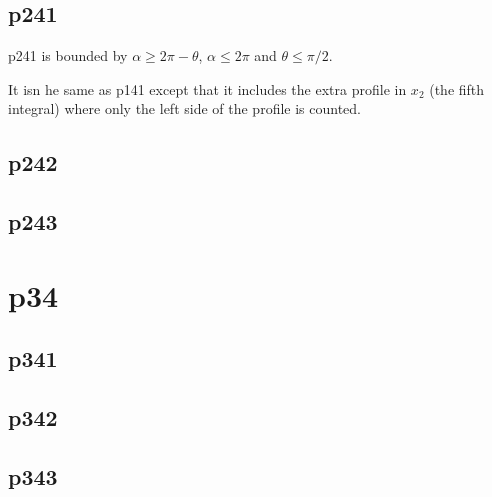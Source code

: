 \subsection{p241} \label{p241}

p241 is bounded by $\alpha \ge 2\pi - \theta$, $\alpha \le 2\pi$ and $\theta \le \pi/2$.

It isn he same as p141 except that it includes the extra profile in $x_2$ (the fifth integral) where only the left side of the profile is counted.



\subsection{p242} \label{p242}






\subsection{p243} \label{p243}







\section{p34} \label{p34}


\subsection{p341} \label{p341}



\subsection{p342} \label{p342}



\subsection{p343} \label{p343}






